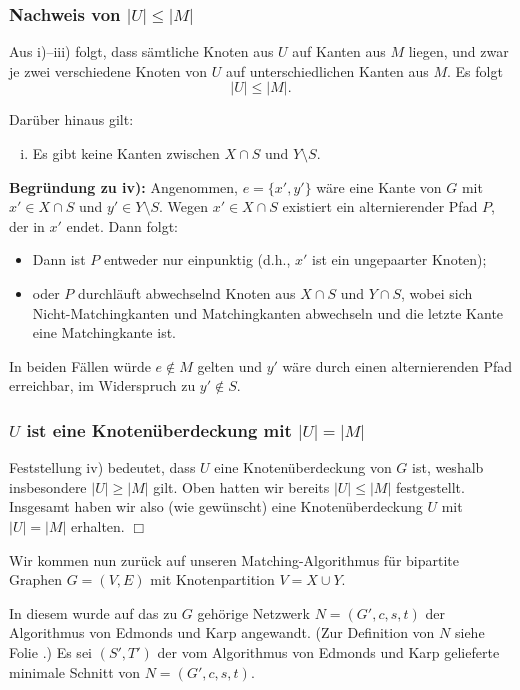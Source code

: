 \documentclass[smaller]{beamer}
\begin{document}
\begin{frame}
 \frametitle{Nachweis von $|U| \le |M|$}
 Aus i)--iii) folgt, dass sämtliche Knoten aus $U$ auf Kanten aus $M$ liegen, und zwar je zwei verschiedene Knoten von $U$ auf unterschiedlichen Kanten aus $M$. Es folgt
\[
|U| \leq |M|.
\]

Darüber hinaus gilt: 
\begin{enumerate}[i)]
\addtocounter{enumi}{3}
\item Es gibt keine Kanten zwischen $X \cap S$ und $Y \setminus S$.
\end{enumerate} \vspace*{0.2cm}

\textbf{Begründung zu iv):} Angenommen, $e=\bigl\{ x',y' \bigr\}$ wäre eine Kante von $G$ mit $x' \in X \cap S$ und $y' \in Y \setminus S$. Wegen $x' \in X \cap S$ existiert ein alternierender Pfad $P$, der in $x'$ endet. Dann folgt:
\begin{itemize}
\item Dann ist $P$ entweder nur einpunktig (d.h., $x'$ ist ein ungepaarter Knoten);
\item oder $P$ durchläuft abwechselnd Knoten aus $X \cap S$ und $Y \cap S$, wobei sich Nicht-Matchingkanten und Matchingkanten abwechseln und die letzte Kante eine Matchingkante ist. 
\end{itemize}
\alert{In beiden Fällen würde $e \notin M$ gelten und $y'$ wäre durch einen alternierenden Pfad erreichbar, im Widerspruch zu $y' \notin S$.}
\end{frame}

\begin{frame}
 \frametitle{$U$ ist eine Knotenüberdeckung mit $|U| = |M|$}
 Feststellung iv) bedeutet, dass $U$ eine Knotenüberdeckung von $G$ ist, weshalb insbesondere $|U| \geq |M|$ gilt. Oben hatten wir bereits $|U| \leq |M|$ festgestellt. Insgesamt haben wir also (wie gewünscht) eine Knotenüberdeckung $U$ mit $|U| = |M|$ erhalten. \qquad $\Box$ \\ \vspace*{0.2cm}
 
 Wir kommen nun zurück auf unseren Matching-Algorithmus für bipartite Graphen $G=(V,E)$ mit Knotenpartition $V=X \cup Y$. \\ \vspace*{0.2cm}
 
 In diesem wurde auf das zu $G$ gehörige Netzwerk $N=(G',c,s,t)$ der Algorithmus von Edmonds und Karp angewandt. (Zur Definition von $N$ siehe Folie \pageref{page:11:6}.) \alert{Es sei $(S',T')$ der vom Algorithmus von Edmonds und Karp gelieferte minimale Schnitt von $N=(G',c,s,t)$.}
\end{frame}
\end{document}
